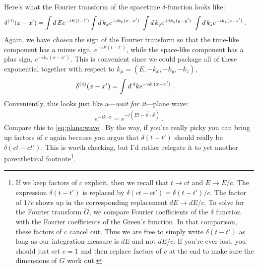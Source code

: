 Here's what the Fourier transform of the spacetime $\delta$-function looks like:
\begin{align}
	\delta^{(4)}(x-x') &=
	\int \dbar E e^{-iE(t-t')}
	\int \dbar k_x e^{+ik_x(x-x')}\
	\int \dbar k_y e^{+ik_y(y-y')}\
	\int \dbar k_z e^{+ik_z(z-z')} \ .
\end{align}
Again, we have \emph{chosen} the sign of the Fourier transform so that the time-like component has a minus sign, $e^{-iE(t-t')}$, while the space-like component has a plus sign, $e^{+ik_x(x-x')}$. This is convenient since we could package all of these exponential together with respect to $k_\mu = (E, -k_x, -k_y, -k_z)$,
\begin{align}
	\delta^{(4)}(x-x') &=
	\int \dbar^4k e^{-ik\cdot (x-x')} \ .
	\label{eq:4D:delta:Fourier}
\end{align}
Conveniently, this looks just like a---\emph{wait for it}---plane wave:
\begin{align}
	e^{-ik\cdot x} = e^{-i\left(Et - \vec{k}\cdot\vec{x}\right)} \ .
\end{align}
Compare this to \eqref{eq:plane:wave}. By the way, if you're really picky you can bring up factors of $c$ again because you argue that $\delta(t-t')$ should really be $\delta(ct-ct')$. This is worth checking, but I'd rather relegate it to yet another parenthetical footnote\footnote{
	If we keep factors of $c$ explicit, then we recall that $t\to ct$ and $E\to E/c$. The expression $\delta(t-t')$ is replaced by $\delta(ct-ct') = \delta(t-t')/c$. The factor of $1/c$ shows up in the corresponding replacement $dE \to dE/c$. To solve for the Fourier transform $\tilde G$, we compare Fourier coefficients of the $\delta$ function with the Fourier coefficients of the Green's function. In that comparison, these factors of $c$ cancel out. Thus we are free to simply write $\delta(t-t')$ as long as our integration measure is $dE$ and not $dE/c$. If you're ever lost, you should just set $c=1$ and then replace factors of $c$ at the end to make sure the dimensions of $G$ work out.
}.

